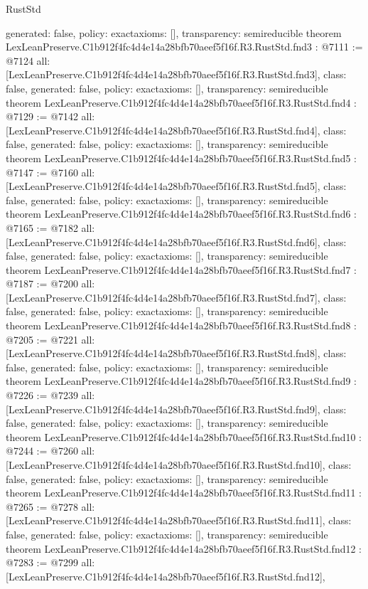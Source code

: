 \begin{lexlean}{RustStd}
\begin{coremodule}
{  generated: false,
  policy: exact{axioms: []},
  transparency: semireducible
}
theorem LexLeanPreserve.C1b912f4fc4d4e14a28bfb70aeef5f16f.R3.RustStd.fnd3 : @7111 := @7124 {
  all: [LexLeanPreserve.C1b912f4fc4d4e14a28bfb70aeef5f16f.R3.RustStd.fnd3],
  class: false,
  generated: false,
  policy: exact{axioms: []},
  transparency: semireducible
}
theorem LexLeanPreserve.C1b912f4fc4d4e14a28bfb70aeef5f16f.R3.RustStd.fnd4 : @7129 := @7142 {
  all: [LexLeanPreserve.C1b912f4fc4d4e14a28bfb70aeef5f16f.R3.RustStd.fnd4],
  class: false,
  generated: false,
  policy: exact{axioms: []},
  transparency: semireducible
}
theorem LexLeanPreserve.C1b912f4fc4d4e14a28bfb70aeef5f16f.R3.RustStd.fnd5 : @7147 := @7160 {
  all: [LexLeanPreserve.C1b912f4fc4d4e14a28bfb70aeef5f16f.R3.RustStd.fnd5],
  class: false,
  generated: false,
  policy: exact{axioms: []},
  transparency: semireducible
}
theorem LexLeanPreserve.C1b912f4fc4d4e14a28bfb70aeef5f16f.R3.RustStd.fnd6 : @7165 := @7182 {
  all: [LexLeanPreserve.C1b912f4fc4d4e14a28bfb70aeef5f16f.R3.RustStd.fnd6],
  class: false,
  generated: false,
  policy: exact{axioms: []},
  transparency: semireducible
}
theorem LexLeanPreserve.C1b912f4fc4d4e14a28bfb70aeef5f16f.R3.RustStd.fnd7 : @7187 := @7200 {
  all: [LexLeanPreserve.C1b912f4fc4d4e14a28bfb70aeef5f16f.R3.RustStd.fnd7],
  class: false,
  generated: false,
  policy: exact{axioms: []},
  transparency: semireducible
}
theorem LexLeanPreserve.C1b912f4fc4d4e14a28bfb70aeef5f16f.R3.RustStd.fnd8 : @7205 := @7221 {
  all: [LexLeanPreserve.C1b912f4fc4d4e14a28bfb70aeef5f16f.R3.RustStd.fnd8],
  class: false,
  generated: false,
  policy: exact{axioms: []},
  transparency: semireducible
}
theorem LexLeanPreserve.C1b912f4fc4d4e14a28bfb70aeef5f16f.R3.RustStd.fnd9 : @7226 := @7239 {
  all: [LexLeanPreserve.C1b912f4fc4d4e14a28bfb70aeef5f16f.R3.RustStd.fnd9],
  class: false,
  generated: false,
  policy: exact{axioms: []},
  transparency: semireducible
}
theorem LexLeanPreserve.C1b912f4fc4d4e14a28bfb70aeef5f16f.R3.RustStd.fnd10 : @7244 := @7260 {
  all: [LexLeanPreserve.C1b912f4fc4d4e14a28bfb70aeef5f16f.R3.RustStd.fnd10],
  class: false,
  generated: false,
  policy: exact{axioms: []},
  transparency: semireducible
}
theorem LexLeanPreserve.C1b912f4fc4d4e14a28bfb70aeef5f16f.R3.RustStd.fnd11 : @7265 := @7278 {
  all: [LexLeanPreserve.C1b912f4fc4d4e14a28bfb70aeef5f16f.R3.RustStd.fnd11],
  class: false,
  generated: false,
  policy: exact{axioms: []},
  transparency: semireducible
}
theorem LexLeanPreserve.C1b912f4fc4d4e14a28bfb70aeef5f16f.R3.RustStd.fnd12 : @7283 := @7299 {
  all: [LexLeanPreserve.C1b912f4fc4d4e14a28bfb70aeef5f16f.R3.RustStd.fnd12],
}
\end{coremodule}
\end{lexlean}
